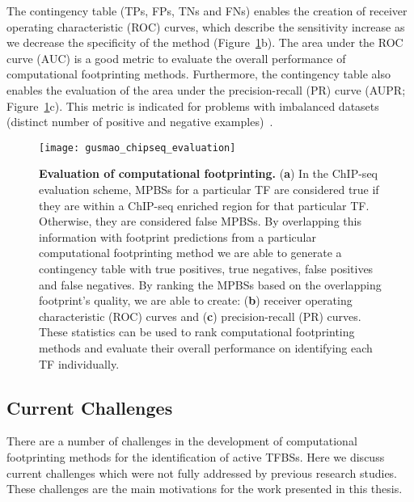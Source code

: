 The contingency table (TPs, FPs, TNs and FNs) enables the creation of receiver operating characteristic (ROC) curves, which describe the sensitivity increase as we decrease the specificity of the method (Figure~\ref{fig:gusmao_chipseq_evaluation}b). The area under the ROC curve (AUC) is a good metric to evaluate the overall performance of computational footprinting methods. Furthermore, the contingency table also enables the evaluation of the area under the precision-recall (PR) curve (AUPR; Figure~\ref{fig:gusmao_chipseq_evaluation}c). This metric is indicated for problems with imbalanced datasets (distinct number of positive and negative examples)~\citep{davis2006,fawcett2006}.

\begin{figure}[h!]
\centering
\texttt{[image: gusmao\_chipseq\_evaluation]}
\caption[Evaluation of computational footprinting]{\textbf{Evaluation of computational footprinting.} (\textbf{a}) In the ChIP-seq evaluation scheme, MPBSs for a particular TF are considered true if they are within a ChIP-seq enriched region for that particular TF. Otherwise, they are considered false MPBSs. By overlapping this information with footprint predictions from a particular computational footprinting method we are able to generate a contingency table with true positives, true negatives, false positives and false negatives. By ranking the MPBSs based on the overlapping footprint's quality, we are able to create: (\textbf{b}) receiver operating characteristic (ROC) curves and (\textbf{c}) precision-recall (PR) curves. These statistics can be used to rank computational footprinting methods and evaluate their overall performance on identifying each TF individually.}
\label{fig:gusmao_chipseq_evaluation}
\end{figure}

\subsection{Current Challenges}
\label{sec:current.challenges}

There are a number of challenges in the development of computational footprinting methods for the identification of active TFBSs. Here we discuss current challenges which were not fully addressed by previous research studies. These challenges are the main motivations for the work presented in this thesis.


